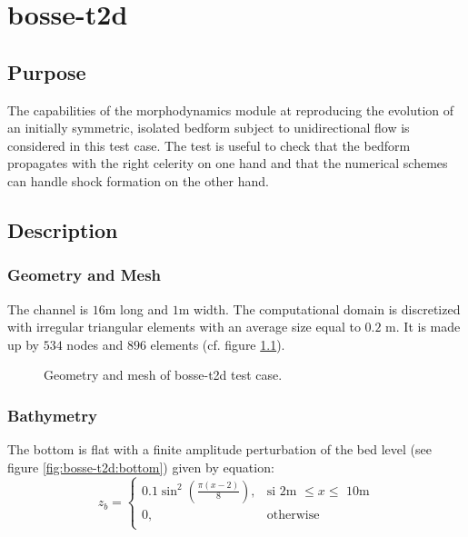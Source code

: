 \chapter{bosse-t2d}
%

%
\section{Purpose}
The capabilities of the morphodynamics module at reproducing the evolution of an initially symmetric, isolated bedform subject to unidirectional flow is considered in this test case.
The test is useful to check that the bedform propagates with the right celerity on one hand and that the numerical schemes can handle shock formation on the other hand.

\section{Description}

\subsection{Geometry and Mesh}
%
The channel is $16$m long and $1$m width.
The computational domain is discretized with irregular triangular elements with an average size equal to $0.2$ m. It is made up by $534$ nodes and $896$ elements (cf. figure \ref{fig:bosse-t2d:mesh}).

\begin{figure}[H]
 \centering
 \caption{Geometry and mesh of bosse-t2d test case.}
 \label{fig:bosse-t2d:mesh}
\end{figure}
%
\subsection{Bathymetry}
%
The bottom is flat with a finite amplitude perturbation of the bed level (see figure \ref{fig:bosse-t2d:bottom}) given by equation:
\begin {equation}
z_b=\left\{
\begin{array}{ll}
\displaystyle
0.1\sin^2\left(\frac{\pi (x-2)}{8}\right), & \text{si 2m $\leq x \leq$ 10m}  \\
\displaystyle
 0, & \text{otherwise} \label{eq:topographie_initiale} \\
\end{array}
\right.
\end{equation}

